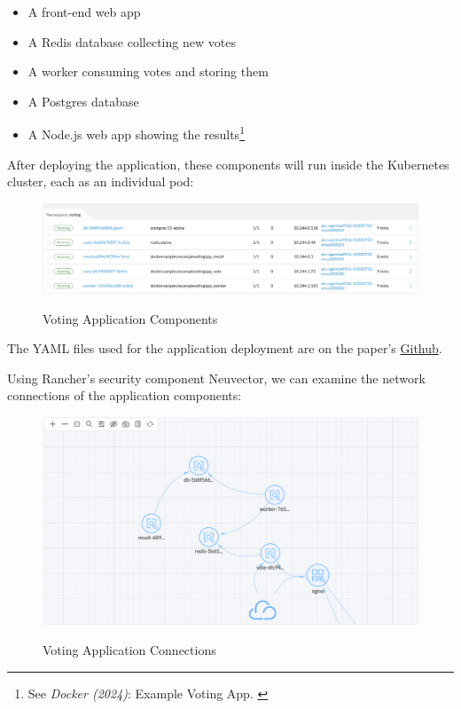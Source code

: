 \begin{itemize}
    \item A front-end web app
    \item A Redis database collecting new votes
    \item A worker consuming votes and storing them
    \item A Postgres database
    \item A Node.js web app showing the results\footnote{See \textit{Docker (2024)}: Example Voting App. \cite{votingGithub}}
\end{itemize}

After deploying the application, these components will run inside the Kubernetes cluster, each as an individual pod:

\begin{figure}[H]
\centering
\caption {Voting Application Components}
\includegraphics[width=\linewidth]{images/voting-pods.png}
\label{fig:votingPods}
\end{figure}

The YAML files used for the application deployment are on the paper's \href{https://github.com/chfrank-cgn/Hausarbeit-DF/tree/main/voting}{Github}.

Using Rancher's security component Neuvector, we can examine the network connections of the application components:

\begin{figure}[H]
\centering
\caption {Voting Application Connections}
\includegraphics[width=\linewidth]{images/voting-map.png}
\label{fig:votingMap}
\end{figure}

